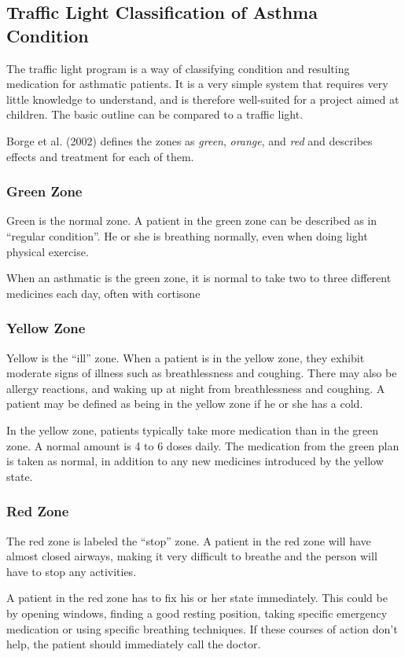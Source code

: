 \subsection{Traffic Light Classification of Asthma Condition}
\label{sec:trafficlight}

The traffic light program is a way of classifying condition and resulting medication for asthmatic 
patients. It is a very simple system that requires very little knowledge to understand, and is 
therefore well-suited for a project aimed at children. The basic outline can be compared to a traffic
light.

Borge et al. (2002)\cite{livingwithasthma} defines the zones as \emph{green}, \emph{orange}, and \emph{red}
and describes effects and treatment for each of them.

\subsubsection{Green Zone}
Green is the normal zone. A patient in the green zone can be described as in ``regular condition''. 
He or she is breathing normally, even when doing light physical exercise.

When an asthmatic is the green zone, it is normal to take two to three different medicines each day,
often with cortisone

\subsubsection{Yellow Zone}
Yellow is the ``ill'' zone. When a patient is in the yellow zone, they exhibit moderate signs of illness
such as breathlessness and coughing. There may also be allergy reactions, and waking up at night from
breathlessness and coughing. A patient may be defined as being in the yellow zone if he or she has a cold.

In the yellow zone, patients typically take more medication than in the green zone. A normal amount
is 4 to 6 doses daily. The medication from the green plan is taken as normal, in addition to any new
medicines introduced by the yellow state.

\subsubsection{Red Zone}
The red zone is labeled the ``stop'' zone. A patient in the red zone will have almost closed airways,
making it very difficult to breathe and the person will have to stop any activities.

A patient in the red zone has to fix his or her state immediately. This could be by opening windows,
finding a good resting position, taking specific emergency medication or using specific breathing
techniques. If these courses of action don't help, the patient should immediately call the doctor.